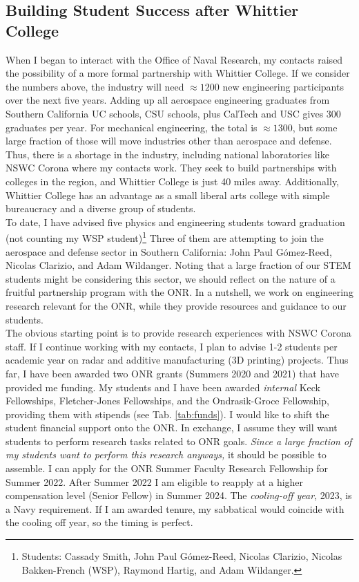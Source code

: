 \documentclass[../../../main.tex]{subfiles}
\begin{document}
\subsection{Building Student Success after Whittier College}

When I began to interact with the Office of Naval Research, my contacts raised the possibility of a more formal partnership with Whittier College.  If we consider the numbers above, the industry will need $\approx 1200$ new engineering participants over the next five years.  Adding up all aerospace engineering graduates from Southern California UC schools, CSU schools, plus CalTech and USC gives 300 graduates per year.  For mechanical engineering, the total is $\approx 1300$, but some large fraction of those will move industries other than aerospace and defense.  Thus, there is a shortage in the industry, including national laboratories like NSWC Corona where my contacts work.  They seek to build partnerships with colleges in the region, and Whittier College is just 40 miles away.  Additionally, Whittier College has an advantage as a small liberal arts college with simple bureaucracy and a diverse group of students.
\\
\vspace{0.25cm}
To date, I have advised five physics and engineering students toward graduation (not counting my WSP student)\footnote{Students: Cassady Smith, John Paul G\'{o}mez-Reed, Nicolas Clarizio, Nicolas Bakken-French (WSP), Raymond Hartig, and Adam Wildanger.}  Three of them are attempting to join the aerospace and defense sector in Southern California: John Paul G\'{o}mez-Reed, Nicolas Clarizio, and Adam Wildanger.  Noting that a large fraction of our STEM students might be considering this sector, we should reflect on the nature of a fruitful partnership program with the ONR.  In a nutshell, we work on engineering research relevant for the ONR, while they provide resources and guidance to our students.
\\
\vspace{0.25cm}
The obvious starting point is to provide research experiences with NSWC Corona staff.  If I continue working with my contacts, I plan to advise 1-2 students per academic year on radar and additive manufacturing (3D printing) projects.  Thus far, I have been awarded two ONR grants (Summers 2020 and 2021) that have provided me funding.  My students and I have been awarded \textit{internal} Keck Fellowships, Fletcher-Jones Fellowships, and the Ondrasik-Groce Fellowship, providing them with stipends (see Tab. \ref{tab:funds}).  I would like to shift the student financial support onto the ONR.  In exchange, I assume they will want students to perform research tasks related to ONR goals.  \textit{Since a large fraction of my students want to perform this research anyways,} it should be possible to assemble.  I can apply for the ONR Summer Faculty Research Fellowship for Summer 2022.  After Summer 2022 I am eligible to reapply at a higher compensation level (Senior Fellow) in Summer 2024.  The \textit{cooling-off year}, 2023, is a Navy requirement.  If I am awarded tenure, my sabbatical would coincide with the cooling off year, so the timing is perfect.
\end{document}
